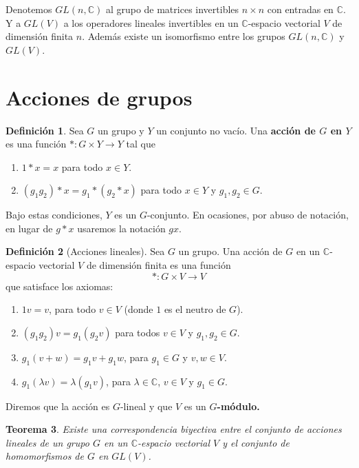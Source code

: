 \documentclass[12pt]{book}
\newtheorem{theorem}{Teorema}[section]
\theoremstyle{definition}
\newtheorem{definition}[theorem]{Definición}
\DeclareMathOperator{\im}{im}
\newcounter{in}
\newcounter{ini}
\begin{document}
Denotemos $GL(n,\mathbb{C})$ al grupo de matrices
invertibles  $n \times n$ con entradas en $\mathbb{C}$.  
Y a $GL(V)$ a los operadores lineales invertibles en un
$\mathbb{C}$-espacio vectorial $V$ de dimensión finita $n$.
Además existe un isomorfismo entre los grupos $GL(n,\mathbb{C})$ y $GL(V)$.

\section{Acciones de grupos}
\label{acc-grup}

\begin{definition}
  Sea $G$ un grupo y $Y$ un conjunto no vacío. Una  \textbf{acción de $G$
  en $Y$} es una función $*:G \times Y \rightarrow Y$ tal que
\begin{enumerate}
\item $1*x=x$ para todo $x\in Y.$
\item $(g_{1}g_{2})*x=g_{1}*(g_{2}*x)$ para todo $x\in Y$ y $g_{1},g_{2}\in G.$
\end{enumerate}
   Bajo estas condiciones, $Y$ es un $G$-conjunto. En ocasiones, por
   abuso de notación, en lugar de $g*x$ usaremos la notación $gx.$
\end{definition}

\begin{definition}[Acciones lineales]
  \label{Gmodulo}
  Sea $G$ un grupo. Una acción de $G$ en un $\mathbb{C}$-espacio
  vectorial $V$ de dimensión finita es una función
 $$*:G\times V \rightarrow V $$
que satisface los axiomas:
\begin{enumerate}
\item $1v=v$, para todo $v\in V$ (donde $1$ es el neutro de $G$).
\item $(g_{1}g_{2})v=g_{1}(g_{2}v)$ para todos $v\in V$ y
  $g_{1},g_{2}\in G$.
\item $g_{1}(v+w)=g_{1}v+g_{1}w$, para $g_{1}\in G$ y $v,w \in V .$
\item $g_{1}(\lambda v)=\lambda(g_{1}v)$, para $\lambda \in \mathbb{C}$,
  $v\in V$ y $g_{1}\in G.$
\end{enumerate}
Diremos que la acción es $G$-lineal y que $V$ es un \textbf{$G$-módulo.}
\end{definition} 

\begin{theorem}
  \label{rep-mod}
  Existe una correspondencia biyectiva entre el conjunto de acciones
  lineales de un grupo $G$ en un $\mathbb{C}$-espacio vectorial $V$ y el conjunto
  de homomorfismos de $G$ en $GL(V)$.
\end{theorem}
\end{document}
